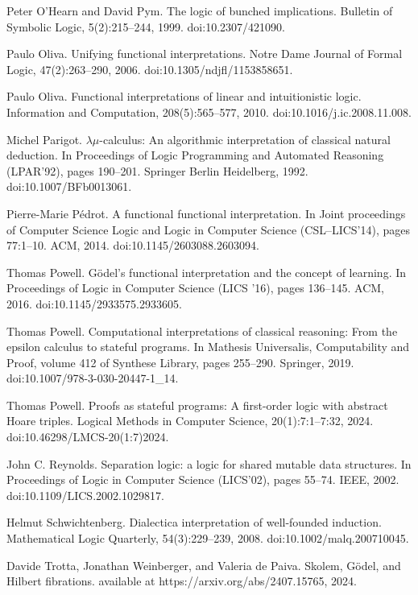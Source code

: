 \documentclass[10pt,a4paper]{article}
\begin{document}
\par\noindent  [29]  Peter O’Hearn and David Pym.  The logic of bunched implications.  Bulletin of Symbolic Logic, 5(2):215–244, 1999.  doi:10.2307/421090.  
 
\par\noindent  [30]  Paulo Oliva.  Unifying functional interpretations.  Notre Dame Journal of Formal Logic, 47(2):263–290, 2006.  doi:10.1305/ndjfl/1153858651.  
 
\par\noindent  [31]  Paulo Oliva.  Functional interpretations of linear and intuitionistic logic.  Information and Computation, 208(5):565–577, 2010.  doi:10.1016/j.ic.2008.11.008.  
 
\par\noindent  [32]  Michel Parigot.  $\lambda\mu$-calculus: An algorithmic interpretation of classical natural deduction.  In Proceedings of Logic Programming and Automated Reasoning (LPAR’92), pages 190–201. Springer Berlin Heidelberg, 1992.  doi:10.1007/BFb0013061.  
 
\par\noindent  [33]  Pierre-Marie Pédrot.  A functional functional interpretation.  In Joint proceedings of Computer Science Logic and Logic in Computer Science (CSL–LICS’14), pages 77:1–10. ACM, 2014.  doi:10.1145/2603088.2603094.  
 
\par\noindent  [34]  Thomas Powell.  Gödel’s functional interpretation and the concept of learning.  In Proceedings of Logic in Computer Science (LICS ’16), pages 136–145. ACM, 2016.  doi:10.1145/2933575.2933605.  
 
\par\noindent  [35]  Thomas Powell.  Computational interpretations of classical reasoning: From the epsilon calculus to stateful programs.  In Mathesis Universalis, Computability and Proof, volume 412 of Synthese Library, pages 255–290. Springer, 2019.  doi:10.1007/978-3-030-20447-1\_14.  
 
\par\noindent  [36]  Thomas Powell.  Proofs as stateful programs: A first-order logic with abstract Hoare triples.  Logical Methods in Computer Science, 20(1):7:1–7:32, 2024.  doi:10.46298/LMCS-20(1:7)2024.  
 
\par\noindent  [37]  John C. Reynolds.  Separation logic: a logic for shared mutable data structures.  In Proceedings of Logic in Computer Science (LICS’02), pages 55–74. IEEE, 2002.  doi:10.1109/LICS.2002.1029817.  
 
\par\noindent  [38]  Helmut Schwichtenberg.  Dialectica interpretation of well-founded induction.  Mathematical Logic Quarterly, 54(3):229–239, 2008.  doi:10.1002/malq.200710045.  
 
\par\noindent  [39]  Davide Trotta, Jonathan Weinberger, and Valeria de Paiva.  Skolem, Gödel, and Hilbert fibrations.  available at https://arxiv.org/abs/2407.15765, 2024.  
  
\end{document}
